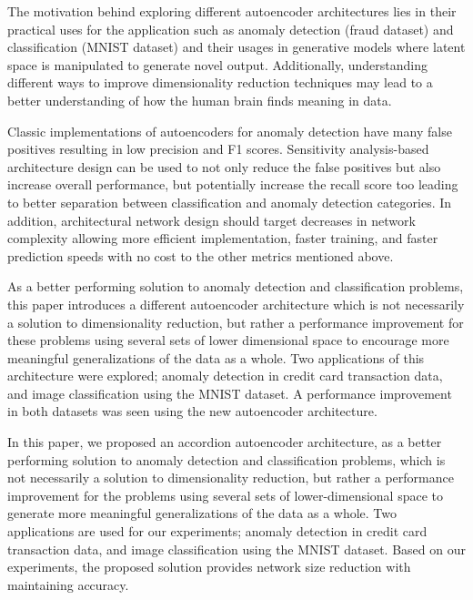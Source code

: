 \documentclass[conference]{IEEEtran}
\begin{document}
The motivation behind exploring different autoencoder architectures lies in their practical uses for the application such as anomaly detection (fraud dataset) and classification (MNIST dataset) and their usages in generative models where latent space is manipulated to generate novel output. Additionally, understanding different ways to improve dimensionality reduction techniques may lead to a better understanding of how the human brain finds meaning in data.

Classic implementations of autoencoders for anomaly detection have many false positives resulting in low precision and F1 scores. Sensitivity analysis-based architecture design can be used to not only reduce the false positives but also increase overall performance, but potentially increase the recall score too leading to better separation between classification and anomaly detection categories. In addition, architectural network design should target decreases in network complexity allowing more efficient implementation, faster training, and faster prediction speeds with no cost to the other metrics mentioned above.

As a better performing solution to anomaly detection and classification problems, this paper introduces a different autoencoder architecture which is not necessarily a solution to dimensionality reduction, but rather a performance improvement for these problems using several sets of lower dimensional space to encourage more meaningful generalizations of the data as a whole. Two applications of this architecture were explored; anomaly detection in credit card transaction data, and image classification using the MNIST dataset. A performance improvement in both datasets was seen using the new autoencoder architecture.

In this paper, we proposed an accordion autoencoder architecture, as a better performing solution to anomaly detection and classification problems, which is not necessarily a solution to dimensionality reduction, but rather a performance improvement for the problems using several sets of lower-dimensional space to generate more meaningful generalizations of the data as a whole. Two applications are used for our experiments; anomaly detection in credit card transaction data, and image classification using the MNIST dataset. Based on our experiments, the proposed solution provides network size reduction with maintaining accuracy.
\end{document}
